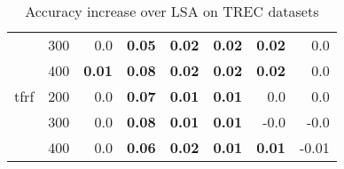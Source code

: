 \begin{table}[H]
\begin{center}
\begin{tabular}{ll|rrrrrr}
   & 300 &       0.0 &  \textbf{0.05} &  \textbf{0.02} &  \textbf{0.02} &  \textbf{0.02} &       0.0 \\
   & 400 &  \textbf{0.01} &  \textbf{0.08} &  \textbf{0.02} &  \textbf{0.02} &  \textbf{0.02} &       0.0 \\
tfrf & 200 &       0.0 &  \textbf{0.07} &  \textbf{0.01} &  \textbf{0.01} &       0.0 &       0.0 \\
   & 300 &       0.0 &  \textbf{0.08} &  \textbf{0.01} &  \textbf{0.01} &      -0.0 &      -0.0 \\
   & 400 &       0.0 &  \textbf{0.06} &  \textbf{0.02} &  \textbf{0.01} &  \textbf{0.01} &      -0.01 \\
\bottomrule
\end{tabular}

\caption[Accuracy increase over LSA on TREC datasets]{Accuracy increase over LSA on TREC datasets}
\label{tab:batch:results:trec}
\end{center}
\end{table}

